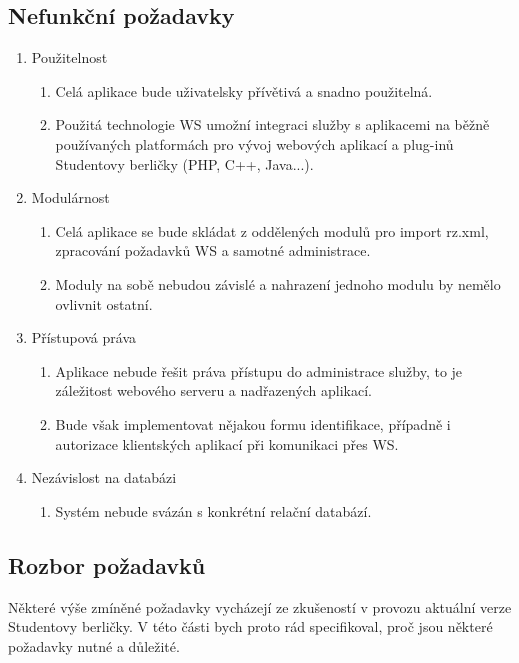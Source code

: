 \documentclass[11pt,twoside,a4paper]{book}
\begin{document}
\subsection{Nefunkční požadavky}
\begin{enumerate}
\item Použitelnost
\begin{enumerate}
\item Celá aplikace bude uživatelsky přívětivá a snadno použitelná.
\item Použitá technologie WS umožní integraci služby s aplikacemi na běžně používaných platformách pro vývoj webových aplikací a plug-inů Studentovy berličky (PHP, C++, Java...).
\end{enumerate}

\item Modulárnost
\begin{enumerate}
\item Celá aplikace se bude skládat z oddělených modulů pro import rz.xml, zpracování požadavků WS a samotné administrace.
\item Moduly na sobě nebudou závislé a nahrazení jednoho modulu by nemělo ovlivnit ostatní.
\end{enumerate}

\item Přístupová práva
\begin{enumerate}
\item Aplikace nebude řešit práva přístupu do administrace služby, to je záležitost webového serveru a nadřazených aplikací.
\item Bude však implementovat nějakou formu identifikace, případně i autorizace klientských aplikací při komunikaci přes WS.
\end{enumerate}

\item Nezávislost na databázi
\begin{enumerate}
\item Systém nebude svázán s konkrétní relační databází.
\end{enumerate}

\end{enumerate}

\subsection{Rozbor požadavků} \label{rozbor}
Některé výše zmíněné požadavky vycházejí ze zkušeností v provozu aktuální verze Studentovy berličky. V této části bych proto rád specifikoval, proč jsou některé požadavky nutné a důležité.
\end{document}
